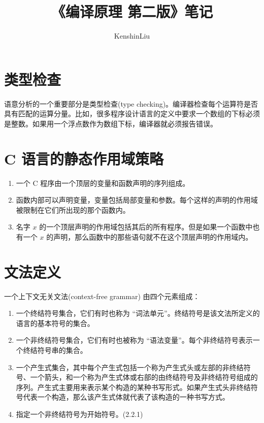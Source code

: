 \documentclass[12pt]{article}
\title{《编译原理 第二版》笔记}
\author{KenshinLiu}
\begin{document}
\maketitle





\newpage

\section*{类型检查}

语意分析的一个重要部分是类型检查(type checking)。编译器检查每个运算符是否具有匹配的运算分量。比如，很多程序设计语言的定义中要求一个数组的下标必须是整数。如果用一个浮点数作为数组下标，编译器就必须报告错误。

\section*{C 语言的静态作用域策略}

\begin{enumerate}
\item 一个 C 程序由一个顶层的变量和函数声明的序列组成。
\item 函数内部可以声明变量，变量包括局部变量和参数。每个这样的声明的作用域被限制在它们所出现的那个函数内。
\item 名字 $x$ 的一个顶层声明的作用域包括其后的所有程序。但是如果一个函数中也有一个 $x$ 的声明，那么函数中的那些语句就不在这个顶层声明的作用域内。
\end{enumerate}

\section*{文法定义}

一个上下文无关文法(context-free grammar) 由四个元素组成：
\begin{enumerate}
\item 一个终结符号集合，它们有时也称为 “词法单元”。终结符号是该文法所定义的语言的基本符号的集合。
\item 一个非终结符号集合，它们有时也被称为 “语法变量”。每个非终结符号表示一个终结符号串的集合。
\item 一个产生式集合，其中每个产生式包括一个称为产生式头或左部的非终结符号、一个箭头，和一个称为产生式体或右部的由终结符号及非终结符号组成的序列。产生式主要用来表示某个构造的某种书写形式。如果产生式头非终结符号代表一个构造，那么该产生式体就代表了该构造的一种书写方式。
\item 指定一个非终结符号为开始符号。(2.2.1)
\end{enumerate}
\end{document}
